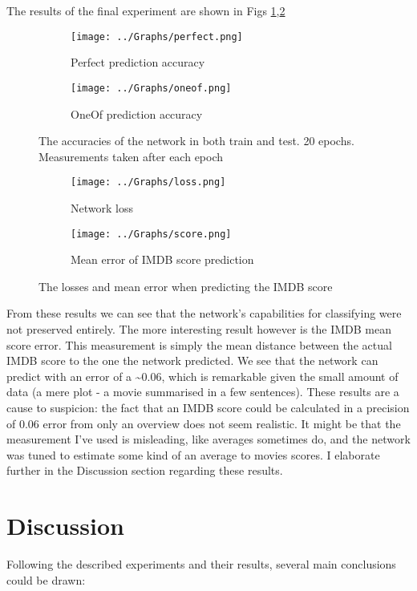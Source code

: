 \documentclass[11pt]{article}
\begin{document}
The results of the final experiment are shown in Figs \ref{fig:accs},\ref{fig:loss}

\begin{figure}
\begin{subfigure}{.5\textwidth}
  \centering
  \caption{Perfect prediction accuracy}
  \texttt{[image: ../Graphs/perfect.png]}
\end{subfigure}
\begin{subfigure}{.5\textwidth}
  \centering
  \caption{OneOf prediction accuracy}
  \texttt{[image: ../Graphs/oneof.png]}
\end{subfigure}
\caption{The accuracies of the network in both train and test. 20 epochs. Measurements taken after each epoch}
\label{fig:accs}
\end{figure}

\begin{figure}
\begin{subfigure}{.5\textwidth}
  \centering
  \caption{Network loss}
  \texttt{[image: ../Graphs/loss.png]}
\end{subfigure}
\begin{subfigure}{.5\textwidth}
  \centering
  \caption{Mean error of IMDB score prediction}
  \texttt{[image: ../Graphs/score.png]}
\end{subfigure}
\caption{The losses and mean error when predicting the IMDB score}
\label{fig:loss}
\end{figure}

From these results we can see that the network's capabilities for classifying were not preserved entirely.
The more interesting result however is the IMDB mean score error. This measurement is simply the mean distance between the actual IMDB score to the one the network predicted.
We see that the network can predict with an error of a \textasciitilde{0.06}, which is remarkable given the small amount of data (a mere plot - a movie summarised in a few sentences).
These results are a cause to suspicion: the fact that an IMDB score could be calculated in a precision of 0.06 error from only an overview does not seem realistic.
It might be that the measurement I've used is misleading, like averages sometimes do, and the network was tuned to estimate some kind of an average to movies scores.
I elaborate further in the Discussion section regarding these results.

\section{Discussion}
Following the described experiments and their results, several main conclusions could be drawn:
\end{document}
